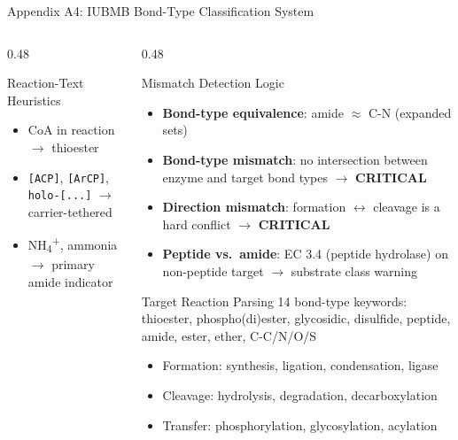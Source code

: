 \documentclass[aspectratio=169, 11pt]{beamer}
\begin{document}
\begin{frame}{Appendix A4: IUBMB Bond-Type Classification System}
\begin{columns}[T]
\begin{column}{0.48\textwidth}
\begin{block}{\small Reaction-Text Heuristics}
\vspace{-2pt}
\begin{itemize}\scriptsize
\setlength\itemsep{0pt}
\item CoA in reaction $\rightarrow$ thioester
\item \texttt{[ACP]}, \texttt{[ArCP]}, \texttt{holo-[...]} $\rightarrow$ carrier-tethered
\item NH\textsubscript{4}\textsuperscript{+}, ammonia $\rightarrow$ primary amide indicator
\end{itemize}
\end{block}
\end{column}
\begin{column}{0.48\textwidth}
\begin{alertblock}{\small Mismatch Detection Logic}
\vspace{-2pt}
\begin{itemize}\scriptsize
\setlength\itemsep{1pt}
\item \textbf{Bond-type equivalence}: amide $\approx$ C-N (expanded sets)
\item \textbf{Bond-type mismatch}: no intersection between enzyme and target bond types $\rightarrow$ \textbf{CRITICAL}
\item \textbf{Direction mismatch}: formation $\leftrightarrow$ cleavage is a hard conflict $\rightarrow$ \textbf{CRITICAL}
\item \textbf{Peptide vs.\ amide}: EC 3.4 (peptide hydrolase) on non-peptide target $\rightarrow$ substrate class warning
\end{itemize}
\end{alertblock}

\begin{exampleblock}{\small Target Reaction Parsing}
\vspace{-2pt}
{\tiny 14 bond-type keywords: thioester, phospho(di)ester, glycosidic, disulfide, peptide, amide, ester, ether, C-C/N/O/S}

\vspace{1pt}
\begin{itemize}\scriptsize
\setlength\itemsep{-1pt}
\item Formation: synthesis, ligation, condensation, ligase
\item Cleavage: hydrolysis, degradation, decarboxylation
\item Transfer: phosphorylation, glycosylation, acylation
\end{itemize}
\end{exampleblock}
\end{column}
\end{columns}
\end{frame}
\end{document}
